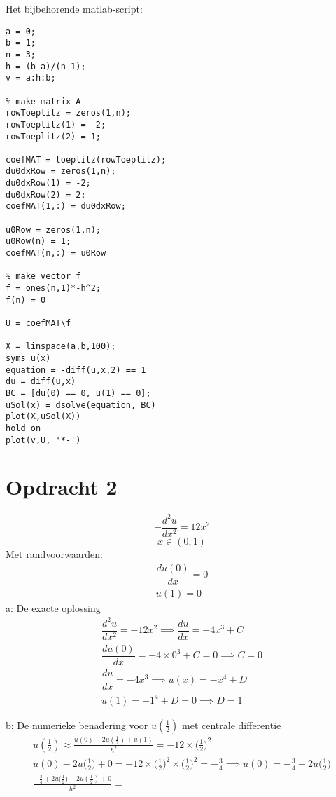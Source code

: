 \documentclass[11pt]{article}
\begin{document}
Het bijbehorende matlab-script:
\begin{lstlisting}
a = 0;
b = 1;
n = 3;
h = (b-a)/(n-1);
v = a:h:b;

% make matrix A
rowToeplitz = zeros(1,n);
rowToeplitz(1) = -2;
rowToeplitz(2) = 1;

coefMAT = toeplitz(rowToeplitz);
du0dxRow = zeros(1,n);
du0dxRow(1) = -2;
du0dxRow(2) = 2;
coefMAT(1,:) = du0dxRow;

u0Row = zeros(1,n);
u0Row(n) = 1;
coefMAT(n,:) = u0Row

% make vector f
f = ones(n,1)*-h^2;
f(n) = 0

U = coefMAT\f

X = linspace(a,b,100);
syms u(x)
equation = -diff(u,x,2) == 1
du = diff(u,x)
BC = [du(0) == 0, u(1) == 0];
uSol(x) = dsolve(equation, BC)
plot(X,uSol(X))
hold on
plot(v,U, '*-')
\end{lstlisting}
\newpage
\section{Opdracht 2}
$$-\dfrac{d^2u}{dx^2} = 12x^2$$
$$ x \in (0,1)$$
Met randvoorwaarden: 
\begin{align*}
\dfrac{du(0)}{dx} = 0\\
u(1) = 0
\end{align*}
a: De exacte oplossing
\begin{gather*}
\dfrac{d^2u}{dx^2} = -12x^2 \implies \dfrac{du}{dx} = -4x^3 + C\\
\dfrac{du(0)}{dx} = -4 \times 0^3 + C = 0 \implies C = 0\\
\dfrac{du}{dx} = -4x^3 \implies u(x) = -x^4 + D\\
u(1) = -1^4 + D = 0 \implies D = 1
\end{gather*}

b: De numerieke benadering voor $u(\frac{1}{2})$ met centrale differentie
\begin{gather*}
u(\frac{1}{2}) \approx \frac{u(0) - 2u(\frac{1}{2}) + u(1)}{h^2} = -12\times \Big(\frac{1}{2}\Big)^2\\
u(0) - 2 u\Big(\frac{1}{2}\Big) + 0 = -12 \times \Big(\frac{1}{2}\Big)^2 \times \Big(\frac{1}{2}\Big)^2 = -\frac{3}{4} \implies u(0) = -\frac{3}{4} + 2u\Big(\frac{1}{2}\Big)\\
\frac{-\frac{3}{4} + 2u\Big(\frac{1}{2}\Big) - 2u(\frac{1}{2}) + 0}{h^2} =
\end{gather*}
\end{document}

